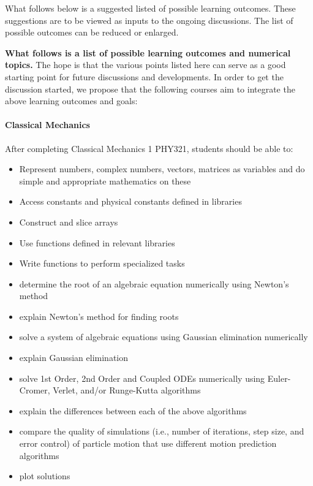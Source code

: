 What follows below is a suggested listed of possible learning outcomes. These suggestions are to be viewed as inputs to the ongoing discussions. The list of possible outcomes can be reduced or enlarged.



\textbf{What follows is a list of possible learning outcomes and numerical topics.}
The hope is that the various points listed here can serve as a good starting point for future discussions and developments. In order to get the discussion started, 
we propose that the following courses aim to integrate the above learning outcomes and goals:


\paragraph{Classical Mechanics}
After completing Classical Mechanics 1 PHY321, students should be able to:
\begin{itemize}
\item Represent numbers, complex numbers, vectors, matrices as variables and do simple and appropriate mathematics on these

\item Access constants and physical constants defined in libraries

\item Construct and slice arrays

\item Use functions defined in relevant libraries

\item Write functions to perform specialized tasks

\item determine the root of an algebraic equation numerically using Newton's method

\item explain Newton's method for finding roots

\item solve a system of algebraic equations using Gaussian elimination numerically

\item explain Gaussian elimination

\item solve 1st Order, 2nd Order and Coupled ODEs numerically using Euler-Cromer, Verlet, and/or Runge-Kutta algorithms

\item explain the differences between each of the above algorithms

\item compare the quality of simulations (i.e., number of iterations, step size, and error control) of particle motion that use different motion prediction algorithms

\item plot solutions
\end{itemize}


